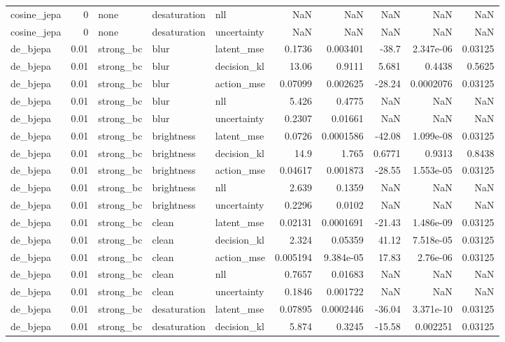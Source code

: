 \begin{tabular}{lrlllrrrrr}
cosine\_jepa & 0 & none & desaturation & nll & NaN & NaN & NaN & NaN & NaN \\
cosine\_jepa & 0 & none & desaturation & uncertainty & NaN & NaN & NaN & NaN & NaN \\
de\_bjepa & 0.01 & strong\_bc & blur & latent\_mse & 0.1736 & 0.003401 & -38.7 & 2.347e-06 & 0.03125 \\
de\_bjepa & 0.01 & strong\_bc & blur & decision\_kl & 13.06 & 0.9111 & 5.681 & 0.4438 & 0.5625 \\
de\_bjepa & 0.01 & strong\_bc & blur & action\_mse & 0.07099 & 0.002625 & -28.24 & 0.0002076 & 0.03125 \\
de\_bjepa & 0.01 & strong\_bc & blur & nll & 5.426 & 0.4775 & NaN & NaN & NaN \\
de\_bjepa & 0.01 & strong\_bc & blur & uncertainty & 0.2307 & 0.01661 & NaN & NaN & NaN \\
de\_bjepa & 0.01 & strong\_bc & brightness & latent\_mse & 0.0726 & 0.0001586 & -42.08 & 1.099e-08 & 0.03125 \\
de\_bjepa & 0.01 & strong\_bc & brightness & decision\_kl & 14.9 & 1.765 & 0.6771 & 0.9313 & 0.8438 \\
de\_bjepa & 0.01 & strong\_bc & brightness & action\_mse & 0.04617 & 0.001873 & -28.55 & 1.553e-05 & 0.03125 \\
de\_bjepa & 0.01 & strong\_bc & brightness & nll & 2.639 & 0.1359 & NaN & NaN & NaN \\
de\_bjepa & 0.01 & strong\_bc & brightness & uncertainty & 0.2296 & 0.0102 & NaN & NaN & NaN \\
de\_bjepa & 0.01 & strong\_bc & clean & latent\_mse & 0.02131 & 0.0001691 & -21.43 & 1.486e-09 & 0.03125 \\
de\_bjepa & 0.01 & strong\_bc & clean & decision\_kl & 2.324 & 0.05359 & 41.12 & 7.518e-05 & 0.03125 \\
de\_bjepa & 0.01 & strong\_bc & clean & action\_mse & 0.005194 & 9.384e-05 & 17.83 & 2.76e-06 & 0.03125 \\
de\_bjepa & 0.01 & strong\_bc & clean & nll & 0.7657 & 0.01683 & NaN & NaN & NaN \\
de\_bjepa & 0.01 & strong\_bc & clean & uncertainty & 0.1846 & 0.001722 & NaN & NaN & NaN \\
de\_bjepa & 0.01 & strong\_bc & desaturation & latent\_mse & 0.07895 & 0.0002446 & -36.04 & 3.371e-10 & 0.03125 \\
de\_bjepa & 0.01 & strong\_bc & desaturation & decision\_kl & 5.874 & 0.3245 & -15.58 & 0.002251 & 0.03125 \\

\end{tabular}
